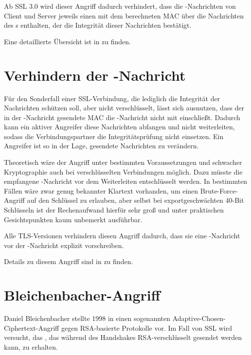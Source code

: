 Ab SSL 3.0 wird dieser Angriff dadurch verhindert, dass die \finished{}-Nachrichten von Client und Server jeweils einen mit dem \mastersecret{} berechneten MAC über die Nachrichten des \handshakeprotocol{}s enthalten, der die Integrität dieser Nachrichten bestätigt.

Eine detaillierte Übersicht ist in \cite{wagner96} zu finden.

\section{Verhindern der \changecipherspec{}-Nachricht}

Für den Sonderfall einer SSL-Verbindung, die lediglich die Integrität der Nachrichten schützen soll, aber nicht verschlüsselt, lässt sich ausnutzen, dass der in der \finished{}-Nachricht gesendete MAC die \changecipherspec{}-Nachricht nicht mit einschließt. Dadurch kann ein aktiver Angreifer diese Nachrichten abfangen und nicht weiterleiten, sodass die Verbindungspartner die Integritätsprüfung nicht einsetzen. Ein Angreifer ist so in der Lage, gesendete Nachrichten zu verändern. 

Theoretisch wäre der Angriff unter bestimmten Voraussetzungen und schwacher Kryptographie auch bei verschlüsselten Verbindungen möglich. Dazu müsste die empfangene \finished{}-Nachricht vor dem Weiterleiten entschlüsselt werden. In bestimmten Fällen wäre zwar genug bekannter Klartext vorhanden, um einen Brute-Force-Angriff auf den Schlüssel zu erlauben, aber selbst bei exportgeschwächten 40-Bit Schlüsseln ist der Rechenaufwand hierfür sehr groß und unter praktischen Gesichtspunkten kaum unbemerkt ausführbar.

Alle TLS-Versionen verhindern diesen Angriff dadurch, dass sie eine \changecipherspec{}-Nachricht vor der \finished{}-Nachricht explizit vorschreiben.

Details zu diesem Angriff sind in \cite{wagner96} zu finden.

\section{Bleichenbacher-Angriff}
\label{sec_attack_bleichenbacher}

Daniel Bleichenbacher stellte 1998 in \cite{bleichenbacher98} einen sogenannten Adaptive-Chosen-Ciphertext-Angriff gegen RSA-basierte Protokolle vor. Im Fall von SSL wird versucht, das \premastersecret{}, das während des Handshakes RSA-verschlüsselt gesendet werden kann, zu erhalten.

